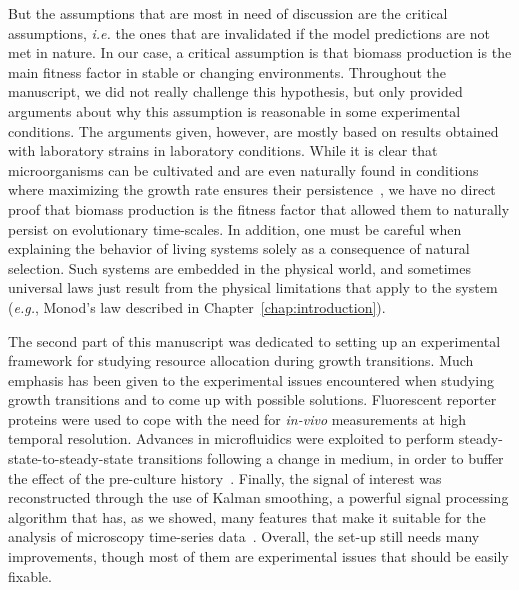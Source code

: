 But the assumptions that are most in need of discussion are the critical assumptions, \textit{i.e.} the ones that are invalidated if the model predictions are not met in nature.
In our case, a critical assumption is that biomass production is the main fitness factor in stable or changing environments.
Throughout the manuscript, we did not really challenge this hypothesis, but only provided arguments about why this assumption is reasonable in some experimental conditions.
The arguments given, however, are mostly based on results obtained with laboratory strains in laboratory conditions.
While it is clear that microorganisms can be cultivated and are even naturally found in conditions where maximizing the growth rate ensures their persistence~\cite{edwards_silico_2001,ibarra_escherichia_2002,lewis_omic_2010,molenaar_shifts_2009}, we have no direct proof that biomass production is the fitness factor that allowed them to naturally persist on evolutionary time-scales.
In addition, one must be careful when explaining the behavior of living systems solely as a consequence of natural selection.
Such systems are embedded in the physical world, and sometimes universal laws just result from the physical limitations that apply to the system (\textit{e.g.}, Monod's law described in Chapter~\ref{chap:introduction}).

The second part of this manuscript was dedicated to setting up an experimental framework for studying resource allocation during growth transitions.
Much emphasis has been given to the experimental issues encountered when studying growth transitions and to come up with possible solutions.
Fluorescent reporter proteins were used to cope with the need for \textit{in-vivo} measurements at high temporal resolution.
Advances in microfluidics were exploited to perform steady-state-to-steady-state transitions following a change in medium, in order to buffer the effect of the pre-culture history~\cite{ng_damage_1962,dufrenne_effect_1997,shaw_effect_1967}.
Finally, the signal of interest was reconstructed through the use of Kalman smoothing, a powerful signal processing algorithm that has, as we showed, many features that make it suitable for the analysis of microscopy time-series data~\cite{kailath_linear_2000,jazwinski_stochastic_2007,kalman_new_1960}.
Overall, the set-up still needs many improvements, though most of them are experimental issues that should be easily fixable.

